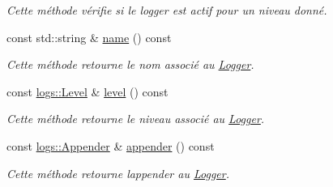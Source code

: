 \begin{DoxyCompactItemize}
\begin{DoxyCompactList}\small\item\em Cette méthode vérifie si le logger est actif pour un niveau donné. \end{DoxyCompactList}\item 
\mbox{\label{classlogs_1_1Logger_a6706ac94e219fd82c6049e376805202e}} 
const std\+::string \& \hyperlink{classlogs_1_1Logger_a6706ac94e219fd82c6049e376805202e}{name} () const
\begin{DoxyCompactList}\small\item\em Cette méthode retourne le nom associé au \hyperlink{classlogs_1_1Logger}{Logger}. \end{DoxyCompactList}\item 
\mbox{\label{classlogs_1_1Logger_a94c013a945cf805fbbc8aa763f73f107}} 
const \hyperlink{classlogs_1_1Level}{logs\+::\+Level} \& \hyperlink{classlogs_1_1Logger_a94c013a945cf805fbbc8aa763f73f107}{level} () const
\begin{DoxyCompactList}\small\item\em Cette méthode retourne le niveau associé au \hyperlink{classlogs_1_1Logger}{Logger}. \end{DoxyCompactList}\item 
\mbox{\label{classlogs_1_1Logger_a48d911418afc6c935cae1e71ed771dee}} 
const \hyperlink{classlogs_1_1Appender}{logs\+::\+Appender} \& \hyperlink{classlogs_1_1Logger_a48d911418afc6c935cae1e71ed771dee}{appender} () const
\begin{DoxyCompactList}\small\item\em Cette méthode retourne l\textquotesingle{}appender au \hyperlink{classlogs_1_1Logger}{Logger}. \end{DoxyCompactList}\end{DoxyCompactItemize}
